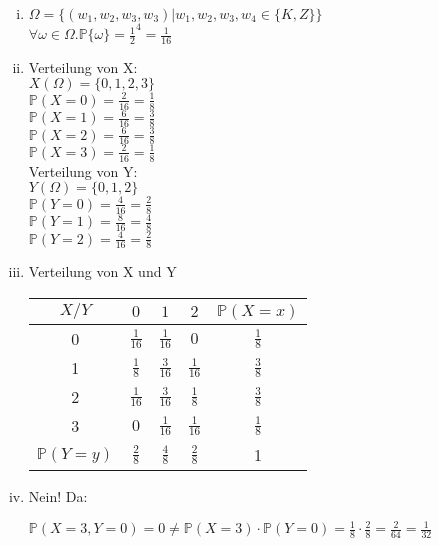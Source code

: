\documentclass[10pt,a4paper,parskip=half]{scrartcl}
\begin{document}
\begin{enumerate}[(i)]
\item  
$ \Omega = \{ (w_1,w_2,w_3,w_3) | w_1,w_2,w_3,w_4 \in \{K,Z\} \} $ \\
$ \forall \omega \in \Omega . \mathbb{P}\{\omega\} = \frac{1}{2}^4 = \frac{1}{16}  $

\item
Verteilung von X:\\
$X(\Omega) = \{0,1,2,3\}$\\
$\mathbb{P}(X = 0) = \frac{2}{16} = \frac{1}{8}$\\
$\mathbb{P}(X = 1) = \frac{6}{16} = \frac{3}{8}$\\
$\mathbb{P}(X = 2) = \frac{6}{16} = \frac{3}{8}$\\
$\mathbb{P}(X = 3) = \frac{2}{16} = \frac{1}{8}$\\

Verteilung von Y:\\
$Y(\Omega) = \{0,1,2\}$\\
$\mathbb{P}(Y = 0) = \frac{4}{16} = \frac{2}{8}$\\
$\mathbb{P}(Y = 1) = \frac{8}{16} = \frac{4}{8}$\\
$\mathbb{P}(Y = 2) = \frac{4}{16} = \frac{2}{8}$\\

\item\leavevmode\vadjust{\vspace{-\baselineskip}}\newline
Verteilung von X und Y
\begin{tabular}{c | c c c | c}
$X/Y$ & $0$ & $1$ & $2$ & $\mathbb{P}(X=x) $\\ \hline
0 & $\frac{1}{16}$ & $\frac{1}{16}$ & $0$ & $\frac{1}{8}$ \\
1 & $\frac{1}{8}$ & $\frac{3}{16}$ & $\frac{1}{16}$ & $\frac{3}{8}$ \\
2 & $\frac{1}{16}$ & $\frac{3}{16}$ & $\frac{1}{8}$ & $\frac{3}{8}$ \\
3 & $0$ & $\frac{1}{16}$ & $\frac{1}{16}$ & $\frac{1}{8}$ \\ \hline
$\mathbb{P}(Y=y)$ & $\frac{2}{8}$ & $\frac{4}{8}$ & $\frac{2}{8}$ & 1
\end{tabular}

\item
Nein! Da: \\\begin{center}
 $\mathbb{P}(X  = 3, Y = 0) = 0 \neq \mathbb{P}(X = 3) \cdot \mathbb{P}(Y = 0) = \frac{1}{8} \cdot \frac{2}{8} = \frac{2}{64} = \frac{1}{32}$
\end{center}
\end{enumerate}
\end{document}
